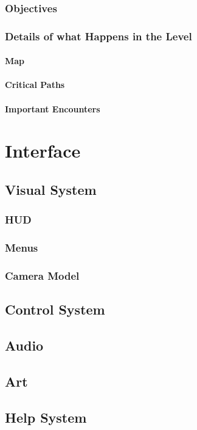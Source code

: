 \documentclass[12pt]{article}
\begin{document}
\subsubsection{Objectives}

\subsubsection{Details of what Happens in the Level}

\paragraph{Map}

\paragraph{Critical Paths}

\paragraph{Important Encounters}

\section{Interface}

\subsection{Visual System}

\subsubsection{HUD}

\subsubsection{Menus}

\subsubsection{Camera Model}

\subsection{Control System}

\subsection{Audio}

\subsection{Art}

\subsection{Help System}
\end{document}
